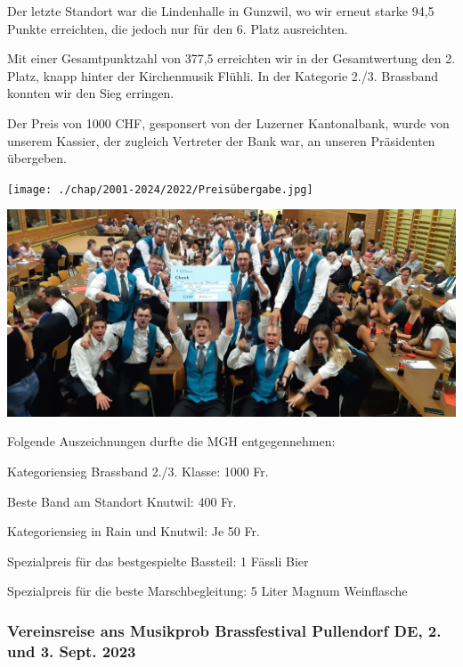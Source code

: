 \begin{history}
    Der letzte Standort war die Lindenhalle in Gunzwil, wo wir erneut starke
    94,5 Punkte erreichten, die jedoch nur für den 6. Platz ausreichten.

    Mit einer Gesamtpunktzahl von 377,5 erreichten wir in der Gesamtwertung den
    2. Platz, knapp hinter der Kirchenmusik Flühli. In der Kategorie 2./3.
    Brassband konnten wir den Sieg erringen.

    Der Preis von 1000 CHF, gesponsert von der Luzerner Kantonalbank, wurde von
    unserem Kassier, der zugleich Vertreter der Bank war, an unseren Präsidenten
    übergeben.

    \begin{MulticolFigure}
        \centering
        \texttt{[image: ./chap/2001-2024/2022/Preisübergabe.jpg]}
    \end{MulticolFigure}


    \begin{MulticolFigure}
        \centering
        \includegraphics[width=0.93\linewidth]{./chap/2001-2024/2022/Feier-Welle.jpg}
    \end{MulticolFigure}


    \noindent Folgende Auszeichnungen durfte die MGH entgegennehmen:

    Kategoriensieg Brassband 2./3. Klasse: 1000 Fr.

    Beste Band am Standort Knutwil: 400 Fr.

    Kategoriensieg in Rain und Knutwil: Je 50 Fr.

    Spezialpreis für das bestgespielte Bassteil: 1 Fässli Bier

    Spezialpreis für die beste Marschbegleitung: 5 Liter Magnum Weinflasche


    \subsubsection*{Vereinsreise ans Musikprob Brassfestival Pullendorf DE, 2. und 3. Sept. 2023}


\end{history}
